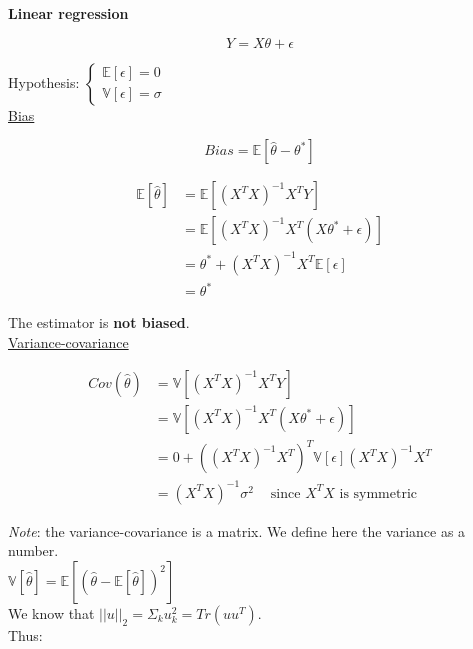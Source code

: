 {\fontsize{12pt}{22pt} \textbf{Linear regression}\par}

$$Y = X \theta + \epsilon$$

Hypothesis: $
\left\{
    \begin{array}{ll}
        \mathbb{E}[\epsilon] = 0 \\
        \mathbb{V}[\epsilon] = \sigma
    \end{array}
\right.
$ \\

\underline{Bias}

$$Bias = \mathbb{E}[\widehat{\theta}-\theta^*]$$

\begin{align*}
  \mathbb{E}[\widehat{\theta}] &= \mathbb{E}[(X^TX)^{-1}X^TY] \\
            &= \mathbb{E}[(X^TX)^{-1}X^T(X \theta^* + \epsilon)] \\
	   &= \theta^* + (X^TX)^{-1}X^T\mathbb{E}[\epsilon] \\
	   &= \theta^*
\end{align*}

The estimator is \textbf{not biased}. \\

\underline{Variance-covariance}

\begin{align*}
  Cov(\widehat{\theta}) &= \mathbb{V}[(X^TX)^{-1}X^TY] \\
            &= \mathbb{V}[(X^TX)^{-1}X^T(X \theta^* + \epsilon)] \\
	   &= 0 + ((X^TX)^{-1}X^T)^T\mathbb{V}[\epsilon] (X^TX)^{-1}X^T \\
	   &= (X^TX)^{-1}\sigma^2 ~~~~\text{ since $X^TX$ is symmetric}
\end{align*}

\textit{Note}: the variance-covariance is a matrix. We define here the variance as a number. \\

$\mathbb{V}[\widehat{\theta}] = \mathbb{E}[(\widehat{\theta} - \mathbb{E}[\widehat{\theta}])^2]$ \\

We know that $||u||_2 = \Sigma_k u_k^2 = Tr(u u^T)$. \\

Thus:

